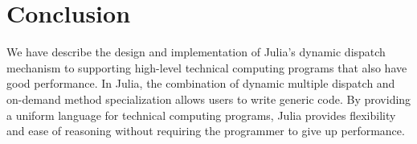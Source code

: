 \documentclass[10pt, preprint]{sigplanconf}
\begin{document}




\section{Conclusion}
We have describe the design and implementation of Julia's dynamic dispatch mechanism to supporting high-level technical computing programs that also have good performance. In Julia, the combination of dynamic multiple dispatch and on-demand method specialization allows users to write generic code. By providing a uniform language for technical computing programs, Julia provides flexibility and ease of reasoning without requiring the programmer to give up performance.

\end{document}
